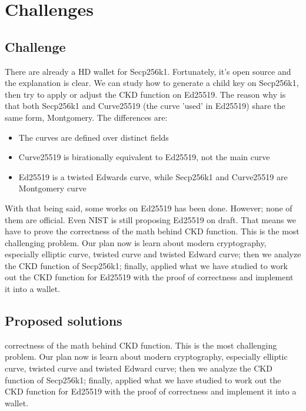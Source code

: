 \chapter{Challenges} \label{chap:Challenges}
\minitoc


\section{Challenge}
There are already a HD wallet for Secp256k1. Fortunately, it's open source and the explanation is clear. We can study how to generate a child key on Secp256k1, then try to apply or adjust the CKD function on Ed25519. The reason why is that both Secp256k1 and Curve25519 (the curve 'used' in Ed25519) share the same form, Montgomery. The differences are:

\begin{itemize}
    \item The curves are defined over distinct fields
    \item Curve25519 is birationally equivalent to Ed25519, not the main curve
    \item Ed25519 is a twisted Edwards curve, while Secp256k1 and Curve25519 are \\ Montgomery curve
\end{itemize}

With that being said, some works on Ed25519 has been done. However; none of them are official. Even NIST is still proposing Ed25519 on draft. That means we have to prove the correctness of the math behind CKD function. This is the most challenging problem. Our plan now is learn about modern cryptography, especially elliptic curve, twisted curve and twisted Edward curve; then we analyze the CKD function of Secp256k1; finally, applied what we have studied to work out the CKD function for Ed25519 with the proof of correctness and implement it into a wallet.

\section{Proposed solutions}
correctness of the math behind CKD function. This is the most challenging problem. Our plan now is learn about modern cryptography, especially elliptic curve, twisted curve and twisted Edward curve; then we analyze the CKD function of Secp256k1; finally, applied what we have studied to work out the CKD function for Ed25519 with the proof of correctness and implement it into a wallet.